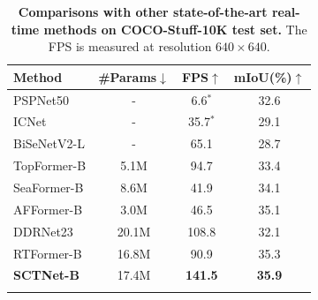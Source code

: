 \documentclass[letterpaper]{article} %
\begin{document}
\begin{table}[t]

  \centering
  \begin{tabular}{l|c|c|c}
    \Xhline{1pt}
    Method & \#Params$\downarrow$ &FPS$\uparrow$ &mIoU(\%)$\uparrow$\\
    \hline
    PSPNet50    &-   &6.6$^*$       &32.6\\
    ICNet       &-  &35.7$^*$ &29.1 \\
    BiSeNetV2-L &-   &65.1       &28.7 \\
    TopFormer-B   &5.1M  &94.7       &33.4 \\
    SeaFormer-B &8.6M   &41.9       &34.1 \\
    AFFormer-B &3.0M  &46.5   &35.1 \\
    DDRNet23    &20.1M  &108.8     &32.1\\
    RTFormer-B  &16.8M  &90.9       &35.3 \\
    \hline
    \textbf{SCTNet-B} &17.4M &\textbf{141.5}  &\textbf{35.9}  \\
    \Xhline{1pt}
  \end{tabular}
  \caption{\textbf{Comparisons with other state-of-the-art real-time methods on COCO-Stuff-10K test set.} The FPS is measured at resolution $640\times640$. }
  \label{sample-COCO-Stuff}
\end{table}
\end{document}
